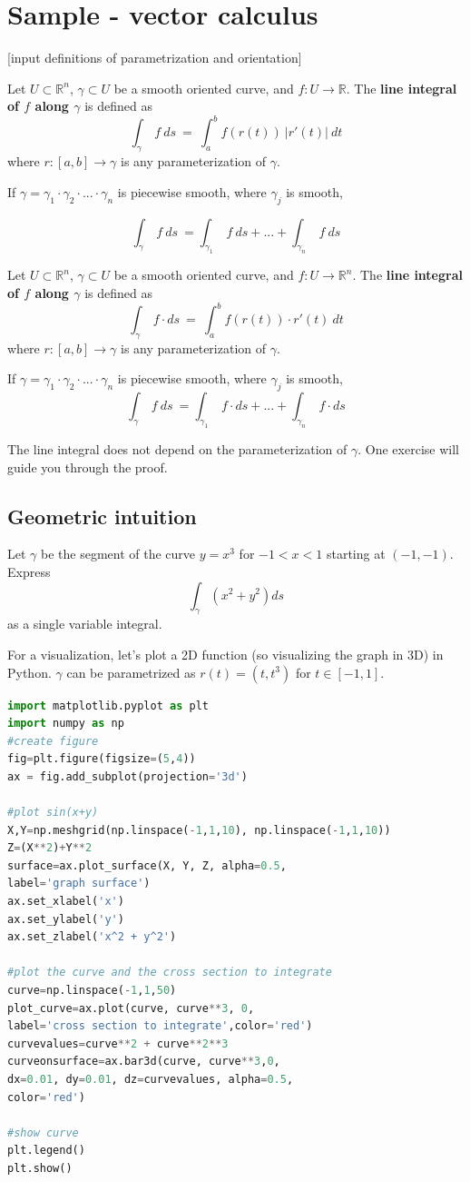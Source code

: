 \documentclass[11pt,openany]{book}
\newcommand{\definition}[2]{\begin{tcolorbox}[title=Definition ({#1}),colframe=black]{#2}\end{tcolorbox}
}
\newcommand{\example}[1]{\begin{tcolorbox}[title=Example,colframe=yellow!50!white,colback=yellow!20!white,coltitle=black]{#1}\end{tcolorbox}
}
\begin{document}
	
	\chapter{Sample - vector calculus}
	
	[input definitions of parametrization and orientation]
	\definition{Line Integral - scalar}{
		Let $U \subset \mathbb{R}^n$, $\gamma \subset U$ be a smooth oriented curve, and $f: U \to \mathbb{R}$. The \textbf{line integral of $f$ along $\gamma$} is defined as
		\[
		\int_\gamma \ f \ ds \ = \ \int_a^b f(r(t)) \ |r'(t)| \ dt
		\]
		where $r : [a,b] \to \gamma$ is any parameterization of $\gamma$.

		If $\gamma =  \gamma_1 \cdot \gamma_2 \cdot ... \cdot \gamma_n  $ is piecewise smooth, where $\gamma_j$ is smooth,

		\[
		\int_\gamma \ f \ ds \ = \int_{\gamma_1} \ f \ ds + ... + \int_{\gamma_n} \ f \ ds
		\]
	}
	\definition{Line Integral - vector}{
		Let $U \subset \mathbb{R}^n$, $\gamma \subset U$ be a smooth oriented curve, and $f: U \to \mathbb{R}^n$. The \textbf{line integral of $f$ along $\gamma$} is defined as
		\[
		\int_\gamma \ f  \cdot ds \ = \ \int_a^b f(r(t)) \cdot r'(t)  \ dt
		\]
		where $r : [a,b] \to \gamma$ is any parameterization of $\gamma$.

		If $\gamma =  \gamma_1 \cdot \gamma_2 \cdot ... \cdot \gamma_n  $ is piecewise smooth, where $\gamma_j$ is smooth,
		\[
		\int_\gamma \ f \ ds \ = \int_{\gamma_1} \ f \cdot ds + ... + \int_{\gamma_n} \ f \cdot ds
		\]
	}

	The line integral does not depend on the parameterization of $\gamma$. One exercise will guide you through the proof.
	\section*{Geometric intuition}
	\example{
		Let $\gamma$ be the segment of the curve $y=x^3$ for $-1<x<1$ starting at $(-1,-1)$.
		Express 
		\[
		\int_{\gamma} (x^2 +y^2) ds
		\]
		as a single variable integral.
	}
	For a visualization, let's plot a 2D function (so visualizing the graph in 3D) in Python. $\gamma$ can be parametrized as $r(t) = (t,t^3)$ for $t\in[-1,1]$.
	\begin{lstlisting}[language=Python]
import matplotlib.pyplot as plt
import numpy as np
#create figure
fig=plt.figure(figsize=(5,4))
ax = fig.add_subplot(projection='3d')

#plot sin(x+y)
X,Y=np.meshgrid(np.linspace(-1,1,10), np.linspace(-1,1,10))
Z=(X**2)+Y**2
surface=ax.plot_surface(X, Y, Z, alpha=0.5,
label='graph surface')
ax.set_xlabel('x')
ax.set_ylabel('y')
ax.set_zlabel('x^2 + y^2')

#plot the curve and the cross section to integrate
curve=np.linspace(-1,1,50)
plot_curve=ax.plot(curve, curve**3, 0,
label='cross section to integrate',color='red')
curvevalues=curve**2 + curve**2**3
curveonsurface=ax.bar3d(curve, curve**3,0,
dx=0.01, dy=0.01, dz=curvevalues, alpha=0.5,
color='red')

#show curve
plt.legend()
plt.show()
	\end{lstlisting}
\end{document}
